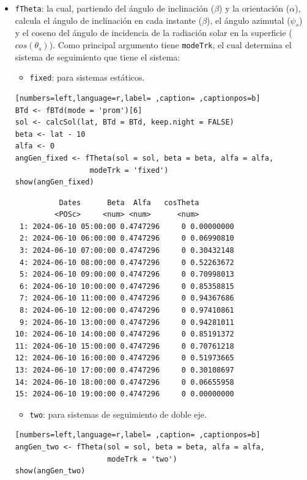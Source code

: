 \begin{itemize}
\item \texttt{fTheta}: la cual, partiendo del ángulo de inclinación (\(\beta\)) y la orientación (\(\alpha\)), calcula el ángulo de inclinación en cada instante (\(\beta\)), el ángulo azimutal (\(\psi_s\)) y el coseno del ángulo de incidencia  de la radiación solar en la superficie (\(cos(\theta_s)\)).
Como principal argumento tiene \texttt{modeTrk}, el cual determina el sistema de seguimiento que tiene el sistema:
\begin{itemize}
\item \texttt{fixed}: para sistemas estáticos.
\end{itemize}
\begin{lstlisting}[numbers=left,language=r,label= ,caption= ,captionpos=b]
BTd <- fBTd(mode = 'prom')[6] 
sol <- calcSol(lat, BTd = BTd, keep.night = FALSE)
beta <- lat - 10
alfa <- 0
angGen_fixed <- fTheta(sol = sol, beta = beta, alfa = alfa,
                 modeTrk = 'fixed')
show(angGen_fixed)
\end{lstlisting}

\begin{verbatim}
		  Dates      Beta  Alfa   cosTheta
		 <POSc>     <num> <num>      <num>
 1: 2024-06-10 05:00:00 0.4747296     0 0.00000000
 2: 2024-06-10 06:00:00 0.4747296     0 0.06990810
 3: 2024-06-10 07:00:00 0.4747296     0 0.30432148
 4: 2024-06-10 08:00:00 0.4747296     0 0.52263672
 5: 2024-06-10 09:00:00 0.4747296     0 0.70998013
 6: 2024-06-10 10:00:00 0.4747296     0 0.85358815
 7: 2024-06-10 11:00:00 0.4747296     0 0.94367686
 8: 2024-06-10 12:00:00 0.4747296     0 0.97410861
 9: 2024-06-10 13:00:00 0.4747296     0 0.94281011
10: 2024-06-10 14:00:00 0.4747296     0 0.85191372
11: 2024-06-10 15:00:00 0.4747296     0 0.70761218
12: 2024-06-10 16:00:00 0.4747296     0 0.51973665
13: 2024-06-10 17:00:00 0.4747296     0 0.30108697
14: 2024-06-10 18:00:00 0.4747296     0 0.06655958
15: 2024-06-10 19:00:00 0.4747296     0 0.00000000
\end{verbatim}

\begin{itemize}
\item \texttt{two}: para sistemas de seguimiento de doble eje.
\end{itemize}
\begin{lstlisting}[numbers=left,language=r,label= ,caption= ,captionpos=b]
angGen_two <- fTheta(sol = sol, beta = beta, alfa = alfa,
                     modeTrk = 'two')
show(angGen_two)
\end{lstlisting}


\end{itemize}
